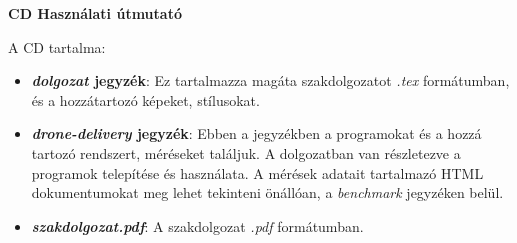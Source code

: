 \pagestyle{empty}

\noindent \textbf{\Large CD Használati útmutató}
%
%
%

\bigskip

\noindent A CD tartalma:
\begin{itemize}
    \item \textbf{\textit{dolgozat} jegyzék}:
    Ez tartalmazza magáta szakdolgozatot \textit{.tex} formátumban, és a hozzátartozó képeket, stílusokat.
    \item \textbf{\textit{drone-delivery} jegyzék}:
    Ebben a jegyzékben a programokat és a hozzá tartozó rendszert, méréseket találjuk.
    A dolgozatban van részletezve a programok telepítése és használata.
    A mérések adatait tartalmazó HTML dokumentumokat meg lehet tekinteni önállóan, a \textit{benchmark} jegyzéken belül.
    \item \textbf{\textit{szakdolgozat.pdf}}:
    A szakdolgozat \textit{.pdf} formátumban.
\end{itemize}



